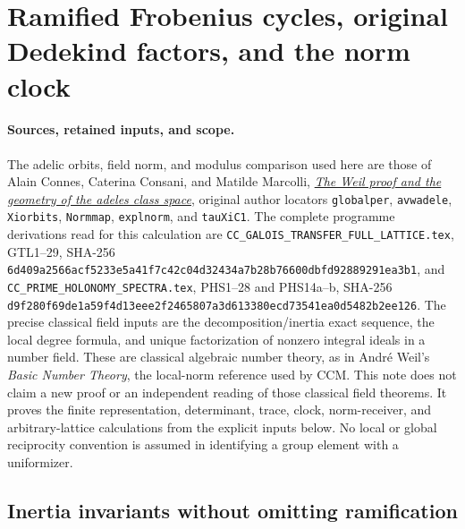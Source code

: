 \section{Ramified Frobenius cycles, original Dedekind factors, and the norm clock}
\label{sec:cc-galois-frobenius-clock}

{\raggedright
\paragraph{Sources, retained inputs, and scope.}
The adelic orbits, field norm, and modulus comparison used here are those of
Alain Connes, Caterina Consani, and Matilde Marcolli,
\href{https://arxiv.org/abs/math/0703392v1}{\emph{The Weil proof and the
geometry of the adeles class space}}, original author locators
\texttt{globalper}, \texttt{avwadele}, \texttt{Xiorbits},
\texttt{Normmap}, \texttt{explnorm}, and \texttt{tauXiC1}.
The complete programme derivations read for this calculation are
\nolinkurl{CC_GALOIS_TRANSFER_FULL_LATTICE.tex}, GTL1--29,
SHA-256
\texttt{6d409a2566acf523\allowbreak{}3e5a41f7c42c04d3\allowbreak{}2434a7b28b76600d\allowbreak{}bfd92889291ea3b1},
and \nolinkurl{CC_PRIME_HOLONOMY_SPECTRA.tex}, PHS1--28 and PHS14a--b,
SHA-256
\texttt{d9f280f69de1a59f\allowbreak{}4d13eee2f2465807\allowbreak{}a3d613380ecd7354\allowbreak{}1ea0d5482b2ee126}.
The precise classical field inputs are the decomposition/inertia exact
sequence, the local degree formula, and unique factorization of nonzero
integral ideals in a number field. These are classical algebraic number
theory, as in Andr\'e Weil's \emph{Basic Number Theory}, the local-norm
reference used by CCM. This note does not claim a new proof or an
independent reading of those classical field theorems. It proves the
finite representation, determinant, trace, clock, norm-receiver, and
arbitrary-lattice calculations from the explicit inputs below. No local
or global reciprocity convention is assumed in identifying a group
element with a uniformizer.
\par}
\subsection{Inertia invariants without omitting ramification}

